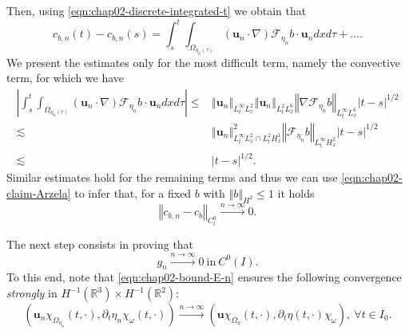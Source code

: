 \documentclass[10pt,a4paper]{article}
\numberwithin{equation}{section}
\begin{document}
Then, using \eqref{eqn:chap02-discrete-integrated-t} we obtain that 
\[c_{b,n}\left(t\right)-c_{b,n}\left(s\right)=\int_{s}^{t}\int_{\Omega_{\eta_{n}\left(\tau\right)}}\left(\mathbf{u}_{n}\cdot\nabla\right)\mathcal{F}_{\eta_{n}}b\cdot\mathbf{u}_{n}dxd\tau+\ldots.
\]
We present the estimates only for the most difficult term, namely the convective term, for which we have 
\begin{equation}
\begin{aligned}\left|\int_{s}^{t}\int_{\Omega_{\eta_{n}\left(\tau\right)}}\left(\mathbf{u}_{n}\cdot\nabla\right)\mathcal{F}_{\eta_{n}}b\cdot\mathbf{u}_{n}dxd\tau\right|\le & \left\Vert \mathbf{u}_{n}\right\Vert _{L_{t}^{\infty}L_{x}^{2}}\left\Vert \mathbf{u}_{n}\right\Vert _{L_{t}^{2}L_{x}^{6}}\left\Vert \nabla\mathcal{F}_{\eta_{n}}b\right\Vert _{L_{t}^{\infty}L_{x}^{6}}\left|t-s\right|^{1/2}\\
\lesssim & \left\Vert \mathbf{u}_{n}\right\Vert _{L_{t}^{\infty}L_{x}^{2}\cap L_{t}^{2}H_{x}^{1}}^{2}\left\Vert \mathcal{F}_{\eta_{n}}b\right\Vert _{L_{t}^{\infty}H_{x}^{2}}\left|t-s\right|^{1/2}\\
\lesssim & \left|t-s\right|^{1/2}.
\end{aligned}
\end{equation}
Similar estimates hold for the remaining terms and thus we can use  \eqref{eqn:chap02-claim-Arzela} to infer that, for a fixed $b$ with $\left\Vert b\right\Vert _{H^{2}}\le1$ it holds
\begin{equation}\label{eqn:c-n-strong-conv}
\left\Vert c_{b,n}-c_{b}\right\Vert _{C_{t}^{0}}\xrightarrow{n\to\infty}0.
\end{equation}

The next step consists in proving that 
\begin{equation}
g_{n}\xrightarrow{n\to\infty}0\ \text{in}\ C^{0}\left(I\right).
\end{equation}
To this end, note that \eqref{eqn:chap02-bound-E-n} ensures the following convergence \emph{strongly} in $H^{-1}\left(\mathbb{R}^{3}\right)\times H^{-1}\left(\mathbb{R}^{2}\right)$:
\begin{equation}
\left(\mathbf{u}_{n}\chi_{\Omega_{\eta_{n}}}\left(t,\cdot\right),\partial_{t}\eta_{n}\chi_{\omega}\left(t,\cdot\right)\right)\xrightarrow{n\rightarrow\infty}\left(\mathbf{u}\chi_{\Omega_{\eta}}\left(t,\cdot\right),\partial_{t}\eta\left(t,\cdot\right)\chi_{\omega}\right),\ \forall t\in I_{0}.
\end{equation}
\end{document}
